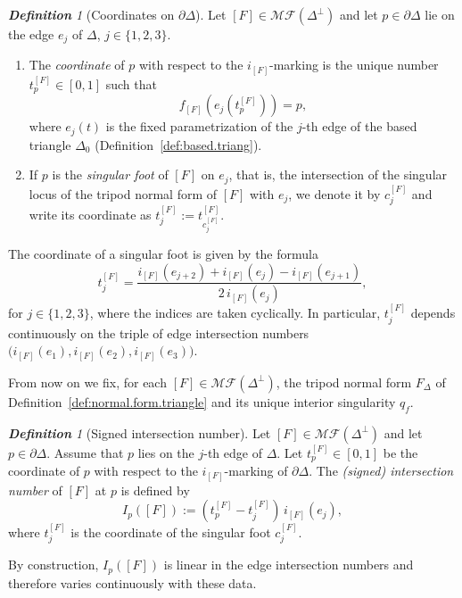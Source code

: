 \documentclass[11pt, letterpaper]{amsart}
\theoremstyle{definition}
\theoremstyle{remark}
\newtheorem{definition}[theorem]{\rm\bf Definition}
\newcommand{\cMF}{\mathcal{MF}}
\newcommand{\DEF}{} \newcommand{\WARN}{\textcolor{red}} \newcommand{\ALT}{\textcolor{brown}} \newcommand{\TODO}{\textcolor{teal}} %
\numberwithin{equation}{section}
\begin{document}
\begin{definition}[Coordinates on \(\partial\Delta\)]
\label{def:coord.pt.marking}
Let \([F]\in\mathcal{MF}(\Delta^{\perp})\) and let \(p\in\partial\Delta\) lie on the edge \(e_j\) of \(\Delta\), \(j\in\{1,2,3\}\).
\begin{enumerate}
\item The \DEF{\em coordinate} of \(p\) with respect to the \(i_{[F]}\)-marking is the unique number \(t_p^{[F]}\in[0,1]\) such that
\[
f_{[F]}(e_j(t_p^{[F]})) = p,
\]
where \(e_j(t)\) is the fixed parametrization of the \(j\)-th edge of the based triangle \(\Delta_0\) (Definition~\ref{def:based.triang}).
\item If \(p\) is the \DEF{\em singular foot} of \([F]\) on \(e_j\), that is, the intersection of the singular locus of the tripod normal form of \([F]\) with \(e_j\), we denote it by \(c_j^{[F]}\) and write its coordinate as \(t_j^{[F]}:=t_{c_j^{[F]}}^{[F]}\).
\end{enumerate}
\end{definition}

The coordinate of a singular foot is given by the formula
\begin{equation}\label{eq:center}
    t^{[F]}_{j}
    = \frac{i_{[F]}(e_{j+2}) + i_{[F]}(e_j) - i_{[F]}(e_{j+1})}
           {2 \, i_{[F]}(e_j)},
\end{equation}
for $j \in \{1,2,3\}$, where the indices are taken cyclically.
In particular, $t^{[F]}_j$ depends continuously on the triple of edge
intersection numbers $\big(i_{[F]}(e_1),i_{[F]}(e_2),i_{[F]}(e_3)\big)$.


From now on we fix, for each $[F] \in \cMF(\Delta^{\perp})$, the tripod normal form $F_\Delta$ of Definition~\ref{def:normal.form.triangle} and its unique interior singularity $q_f$.

\begin{definition}[Signed intersection number]
\label{def:I(p)}
Let $[F]\in\cMF(\Delta^{\perp})$ and let $p\in\partial\Delta$.
Assume that $p$ lies on the $j$-th edge of $\Delta$.
Let $t^{[F]}_p\in [0,1]$ be the coordinate of $p$ with respect to the
$i_{[F]}$-marking of $\partial\Delta$. The \DEF{\em (signed) intersection number} of $[F]$ at $p$ is defined by
\[
    I_p([F]) := (t^{[F]}_p - t^{[F]}_{j}) \, i_{[F]}(e_j),
\]
where $t_j^{[F]}$ is the coordinate of the singular foot $c_j^{[F]}$.
\end{definition}

By construction, $I_p([F])$ is linear in the edge intersection numbers and
therefore varies continuously with these data.
\end{document}
